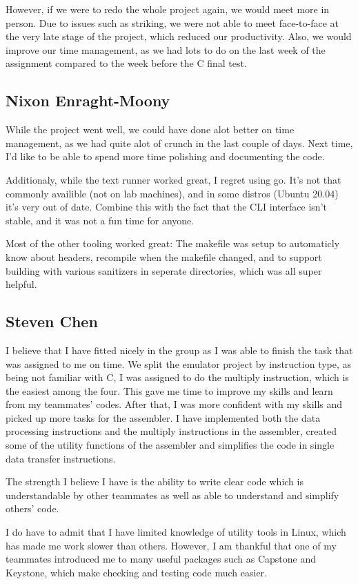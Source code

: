 \documentclass[11pt, a4paper]{article}
\begin{document}
However, if we were to redo the whole project again, we would meet more in person. Due to issues such as striking, we were not able to meet face-to-face at the very late stage of the project, which reduced our productivity. Also, we would improve our time management, as we had lots to do on the last week of the assignment compared to the week before the C final test.
\subsection{Nixon Enraght-Moony}
While the project went well, we could have done alot better on time management, as we had quite alot of crunch in the last couple of days. Next time, I'd like to be able to spend more time polishing and documenting the code.
\par
Additionaly, while the text runner worked great, I regret using go. It's not that commonly availible (not on lab machines), and in some distros (Ubuntu 20.04) it's very out of date. Combine this with the fact that the CLI interface isn't stable, and it was not a fun time for anyone.
\par
Most of the other tooling worked great: The makefile was setup to automaticly know about headers, recompile when the makefile changed, and to support building with various sanitizers in seperate directories, which was all super helpful.
\subsection{Steven Chen}
I believe that I have fitted nicely in the group as I was able to finish the task that was assigned to me on time. We split the emulator project by instruction type, as being not familiar with C, I was assigned to do the multiply instruction, which is the easiest among the four. This gave me time to improve my skills and learn from my teammates’ codes. After that, I was more confident with my skills and picked up more tasks for the assembler. I have implemented both the data processing instructions and the multiply instructions in the assembler, created some of the utility functions of the assembler and simplifies the code in single data transfer instructions. 

The strength I believe I have is the ability to write clear code which is understandable by other teammates as well as able to understand and simplify others’ code. 

I do have to admit that I have limited knowledge of utility tools in Linux, which has made me work slower than others. However, I am thankful that one of my teammates introduced me to many useful packages such as Capstone and Keystone, which make checking and testing code much easier. 
\end{document}
